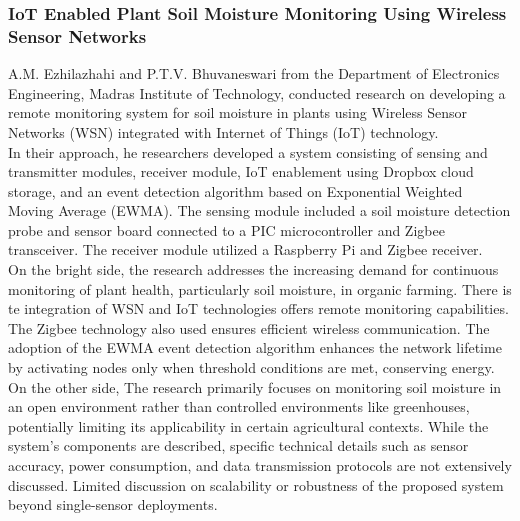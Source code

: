 \documentclass[12pt, a4paper]{article}
\begin{document}
\subsubsection{IoT Enabled Plant Soil Moisture Monitoring Using Wireless Sensor Networks}
A.M. Ezhilazhahi and P.T.V. Bhuvaneswari from the Department of Electronics Engineering, Madras Institute of Technology, conducted research on developing a remote monitoring system for soil moisture in plants using Wireless Sensor Networks (WSN) integrated with Internet of Things (IoT) technology.\\
In their approach, he researchers developed a system consisting of sensing and transmitter modules,
receiver module, IoT enablement using Dropbox cloud storage, and an event detection algorithm based on Exponential Weighted Moving Average (EWMA). The sensing module included a soil moisture detection probe and sensor board connected to a PIC microcontroller and Zigbee transceiver. The receiver module utilized a Raspberry Pi and Zigbee receiver.\\
On the bright side, the research addresses the increasing demand for continuous monitoring of plant health, particularly soil moisture, in organic farming. There is te integration of WSN and IoT technologies offers remote monitoring capabilities. The Zigbee technology also  used ensures efficient wireless communication. The adoption of the EWMA event detection algorithm enhances the network lifetime by activating nodes only when threshold conditions are met, conserving energy.\\
On the other side, The research primarily focuses on monitoring soil moisture in an open environment rather than controlled environments like greenhouses, potentially limiting its applicability in certain
agricultural contexts. While the system's components are described, specific technical details such as sensor accuracy, power consumption, and data transmission protocols are not extensively discussed. Limited discussion on scalability or robustness of the proposed system beyond single-sensor deployments.
\end{document}
